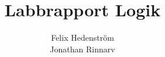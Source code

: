 \documentclass[a4paper]{article}
\begin{document}
\title{Labbrapport Logik}
\author{Felix Hedenström\\ Jonathan Rinnarv}
\maketitle
\end{document}
